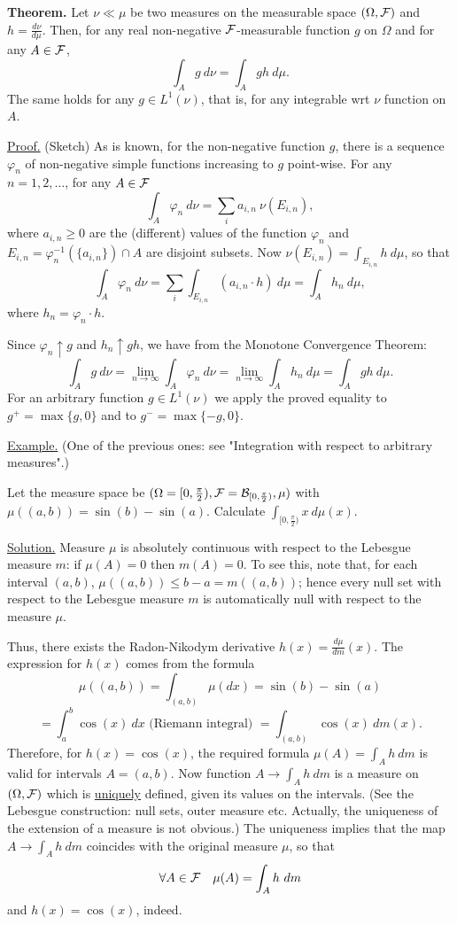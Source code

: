 \documentclass[a4paper,10pt]{article}
\newcommand{\1}[1]{\mathbf{1}_{\{#1\}}}
\begin{document}
{\bf Theorem.} Let $\nu\ll\mu$ be two measures on the measurable space $(\Omega,{\cal F})$ and $h=\frac{d\nu}{d\mu}$. Then, for any real non-negative ${\cal F}$-measurable function $g$ on $\Omega$ and for any $A\in{\cal F}$,
  $$\int_A g~d\nu=\int_A gh~d\mu.$$
The same holds for any $g\in L^1(\nu)$, that is, for any integrable wrt $\nu$ function on $A$.

\underline{Proof.} (Sketch) As is known, for the non-negative function $g$, there is a sequence $\varphi_n$ of non-negative simple functions increasing to $g$ point-wise. For any $n=1,2,\ldots$, for any $A\in{\cal F}$
  $$\int_A \varphi_n~d\nu=\sum_i a_{i,n}~\nu(E_{i,n}),$$
where $a_{i,n}\ge 0$ are the (different) values of the function $\varphi_n$ and $E_{i,n}=\varphi^{-1}_n(\{a_{i,n}\})\cap A$ are disjoint subsets. Now $\nu(E_{i,n})=\int_{E_{i,n}} h~d\mu$, so that
  $$\int_A \varphi_n~d\nu=\sum_i \int_{E_{i,n}}(a_{i,n}\cdot h)~d\mu=\int_A h_n~d\mu,$$
where $h_n=\varphi_n\cdot h$.

Since $\varphi_n\uparrow g$ and $h_n\uparrow gh$, we have from the Monotone Convergence Theorem:
  $$\int_A g~d\nu=\lim_{n\to\infty} \int_A \varphi_n~d\nu=\lim_{n\to\infty} \int_A h_n~d\mu=\int_A gh~d\mu.$$
For an arbitrary function $g\in L^1(\nu)$ we apply the proved equality to $g^+=\max\{ g,0\}$ and to $g^-=\max\{-g,0\}$. \blacksquare

\underline{Example.} (One of the previous ones: see "Integration with respect to arbitrary measures".)

Let the measure space be $(\Omega=[0,\frac{\pi}{2}),{\cal F}={\cal B}_{[0,\frac{\pi}{2})},\mu)$ with $\mu((a,b))=\sin(b)-\sin(a)$. Calculate $\int_{[0,\frac{\pi}{2})} x~d\mu(x)$.

\underline{Solution.} Measure $\mu$ is absolutely continuous with respect to the Lebesgue measure $m$: if $\mu(A)=0$ then $m(A)=0$. To see this, note that, for each interval $(a,b)$, $\mu((a,b))\le b-a=m((a,b))$; hence every null set with respect to the Lebesgue measure $m$ is automatically null  with respect to the measure $\mu$.

Thus, there exists the Radon-Nikodym derivative $h(x)=\frac{d\mu}{dm}(x)$. The expression for $h(x)$ comes from the formula
$$\mu((a,b))=\int_{(a,b)}\mu(dx)=\sin(b)-\sin(a)$$
$$=\int_a^b\cos(x)~dx \mbox{ (Riemann integral) }=\int_{(a,b)}\cos(x)~dm(x).$$
Therefore, for $h(x)=\cos(x)$, the required formula $\mu(A)=\int_A h~dm$ is valid for intervals $A=(a,b)$. Now function $A\to\int_A h~dm$ is a measure on $(\Omega,{\cal F})$ which is \underline{uniquely} defined, given its values on the intervals. (See the Lebesgue construction: null sets, outer measure etc. Actually, the uniqueness of the extension of a measure is not obvious.) The uniqueness implies that the map $A\to\int_A h~dm$ coincides with the original measure $\mu$, so that
$$\forall A\in{\cal F}~~~\mu(A)=\int_A h~dm$$
and $h(x)=\cos(x)$, indeed.
\end{document}
